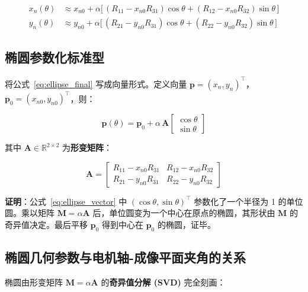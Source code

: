 \documentclass[12pt,a4paper]{article}
\begin{document}
\begin{equation}
\begin{aligned}
x_n(\theta) &\approx x_{n0} +
\alpha\big[\,(R_{11} - x_{n0} R_{31})\cos\theta + (R_{12} - x_{n0} R_{32})\sin\theta\,\big] \\[6pt]
y_n(\theta) &\approx y_{n0} +
\alpha\big[\,(R_{21} - y_{n0} R_{31})\cos\theta + (R_{22} - y_{n0} R_{32})\sin\theta\,\big]
\end{aligned}
\label{eq:ellipse_final}
\end{equation}

\subsection{椭圆参数化标准型}

将公式~\eqref{eq:ellipse_final} 写成向量形式。定义向量 $\mathbf{p} = (x_n, y_n)^{\top}$，$\mathbf{p}_0 = (x_{n0}, y_{n0})^{\top}$，则：

\begin{equation}
\mathbf{p}(\theta) = \mathbf{p}_0 + \alpha \,
\mathbf{A}
\begin{bmatrix}
\cos\theta \\ \sin\theta
\end{bmatrix}
\label{eq:ellipse_vector}
\end{equation}

其中 $\mathbf{A} \in \mathbb{R}^{2 \times 2}$ 为\textbf{形变矩阵}：

\begin{equation}
\boxed{
\mathbf{A} =
\begin{bmatrix}
R_{11} - x_{n0} R_{31} & R_{12} - x_{n0} R_{32} \\[4pt]
R_{21} - y_{n0} R_{31} & R_{22} - y_{n0} R_{32}
\end{bmatrix}
}
\label{eq:deformation_matrix}
\end{equation}

\textbf{证明}：公式~\eqref{eq:ellipse_vector} 中 $(\cos\theta, \sin\theta)^{\top}$ 参数化了一个半径为 1 的单位圆。乘以矩阵 $\mathbf{M} = \alpha \mathbf{A}$ 后，单位圆变为一个中心在原点的椭圆，其形状由 $\mathbf{M}$ 的奇异值决定。最后平移 $\mathbf{p}_0$ 得到中心在 $\mathbf{p}_0$ 的椭圆，证毕。

\subsection{椭圆几何参数与电机轴-成像平面夹角的关系}

椭圆由形变矩阵 $\mathbf{M} = \alpha \mathbf{A}$ 的\textbf{奇异值分解 (SVD)} 完全刻画：
\end{document}
